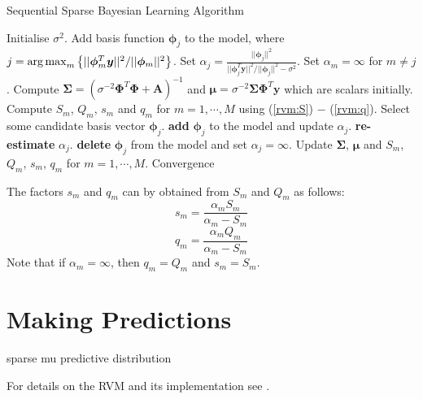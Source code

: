 \begin{algorithm}
  \caption{Sequential Sparse Bayesian Learning Algorithm \cite{tipping2003}}
  \label{rvm:alg2}
  \begin{algorithmic}[1]
    \State Initialise $\sigma^2$.
    \State Add basis function $\bm\phi_j$ to the model, where $j = \operatorname*{arg\,max}_m \left\{||\bm\phi_m^T\bm y||^2/||\bm\phi_m||^2\right\}$.
    \Statex Set $\alpha_j = \frac{||\bm\phi_j||^2}{||\bm\phi_j^T\bm y||^2/||\bm\phi_j||^2 - \sigma^2}$. Set $\alpha_m = \infty$ for $m\neq j$.
    \State Compute $\bm\Sigma = \left(\sigma^{-2}\bm\Phi^T\bm\Phi + \bm A\right)^{-1}$ and $\bm\mu = \sigma^{-2}\bm\Sigma\bm\Phi^T\bm y$ which are scalars initially.
    \Statex Compute $S_m$, $Q_m$, $s_m$ and $q_m$ for $m = 1,\cdots,M$ using (\ref{rvm:S}) $-$ (\ref{rvm:q}). %
    \Repeat
    \State Select some candidate basis vector $\bm\phi_j$.
     \textbf{add} $\bm\phi_j$ to the model and update $\alpha_j$. \EndIIf
     \textbf{re-estimate} $\alpha_j$. \EndIIf
     \textbf{delete} $\bm\phi_j$ from the model and set $\alpha_j=\infty$. \EndIIf
    \State Update $\bm\Sigma$, $\bm\mu$ and $S_m$, $Q_m$, $s_m$, $q_m$ for $m = 1,\cdots, M$.
    \Until Convergence
  \end{algorithmic}
\end{algorithm}

The factors $s_m$ and $q_m$ can by obtained from $S_m$ and $Q_m$ as follows:
\begin{equation}
  \label{rvm:s}
  s_m = \frac{\alpha_m S_m}{\alpha_m - S_m}
\end{equation}
\begin{equation}
  \label{rvm:q}
  q_m = \frac{\alpha_m Q_m}{\alpha_m - S_m}
\end{equation}
Note that if $\alpha_m = \infty$, then $q_m = Q_m$ and $s_m = S_m$.



\section{Making Predictions}
sparse mu
predictive distribution

For details on the RVM and its implementation see \cite{pilikos2014,tipping2003,tipping2001}.


